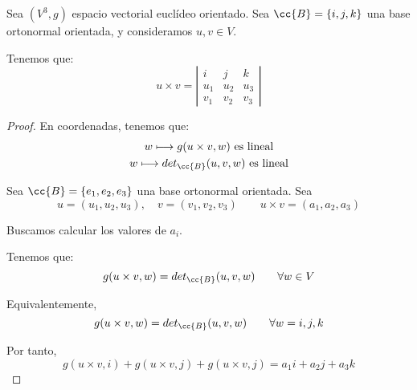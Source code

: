 \begin{prop}
    Sea $(V^3, g)$ espacio vectorial euclídeo orientado. Sea $\cc{B}=\{i,j,k\}$ una base ortonormal orientada, y consideramos $u,v\in V$.
    
    Tenemos que:
    \begin{equation*}
        u\times v = \left|\begin{array}{ccc}
            i & j & k \\
            u_1 & u_2 & u_3 \\
            v_1 & v_2 & v_3
        \end{array}\right|
    \end{equation*}
\end{prop}
\begin{proof}
    En coordenadas, tenemos que:
    \begin{gather*}
        w \longmapsto g(u\times v, w) \text{ es lineal} \\
        w \longmapsto det_{\cc{B}} (u,v,w) \text{ es lineal}
    \end{gather*}

    Sea $\cc{B}=\{e_1, e_2, e_3\}$ una base ortonormal orientada. Sea $$u=(u_1, u_2, u_3),\quad v=(v_1, v_2, v_3) \qquad u\times v = (a_1,a_2,a_3)$$

    Buscamos calcular los valores de $a_i$.

    Tenemos que:
    \begin{equation*}
        g(u\times v, w)=det_{\cc{B}} (u,v,w)\qquad \forall w\in V
    \end{equation*}

    Equivalentemente,
    \begin{equation*}
        g(u\times v, w)=det_{\cc{B}} (u,v,w)\qquad \forall w=i,j,k
    \end{equation*}

    Por tanto,
    \begin{equation*}
        g(u\times v,i) + g(u\times v,j) + g(u\times v, j) = a_1 i + a_2 j + a_3 k
    \end{equation*}


\end{proof}
